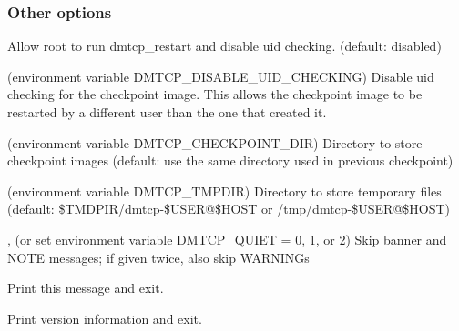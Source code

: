 \subsubsection{Other options}
\begin{Description}
  \item[\Opt{--run-as-root}]
    Allow root to run dmtcp_restart and disable uid checking.
    (default: disabled)

  \item[\Opt{--no-strict-uid-checking} (environment variable DMTCP_DISABLE_UID_CHECKING)]
    Disable uid checking for the checkpoint image. This allows the checkpoint image
    to be restarted by a different user than the one that created it.

  \item[\OptSArg{--ckptdir}{path} (environment variable DMTCP_CHECKPOINT_DIR)]
    Directory to store checkpoint images (default: use the same directory used in previous checkpoint)

  \item[\OptSArg{--tmpdir}{path} (environment variable DMTCP_TMPDIR)]
    Directory to store temporary files
    (default: \$TMDPIR/dmtcp-\$USER@\$HOST or /tmp/dmtcp-\$USER@\$HOST)

  \item[\Opt{-q}, \Opt{--quiet} (or set environment variable DMTCP_QUIET = 0, 1, or 2)]
    Skip banner and NOTE messages; if given twice, also skip WARNINGs

  \item[\Opt{--help}] Print this message and exit.

  \item[\Opt{--version}] Print version information and exit.
\end{Description}

